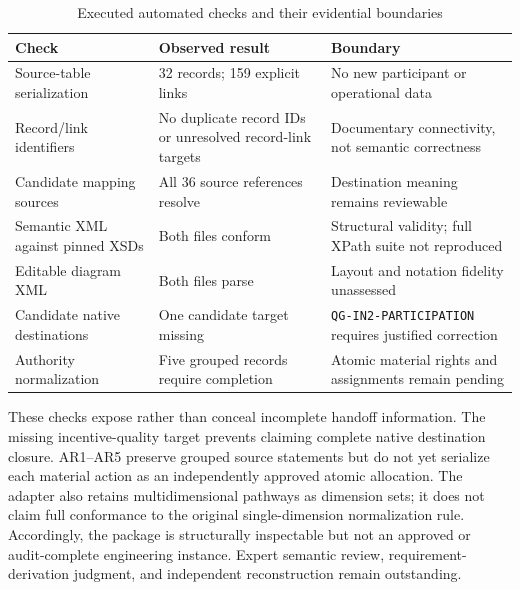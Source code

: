 \documentclass[referee,sn-basic]{sn-jnl}
\begin{document}
\begin{table}[t]
\caption{Executed automated checks and their evidential boundaries}
\label{tab:automated-replication}
\centering\footnotesize
\begin{tabularx}{\linewidth}{@{}p{.30\linewidth}p{.20\linewidth}X@{}}
\toprule
Check & Observed result & Boundary \\
\midrule
Source-table serialization & 32 records; 159 explicit links & No new participant or operational data \\
Record/link identifiers & No duplicate record IDs or unresolved record-link targets & Documentary connectivity, not semantic correctness \\
Candidate mapping sources & All 36 source references resolve & Destination meaning remains reviewable \\
Semantic XML against pinned XSDs & Both files conform & Structural validity; full XPath suite not reproduced \\
Editable diagram XML & Both files parse & Layout and notation fidelity unassessed \\
Candidate native destinations & One candidate target missing & \texttt{QG-IN2-PARTICIPATION} requires justified correction \\
Authority normalization & Five grouped records require completion & Atomic material rights and assignments remain pending \\
\bottomrule
\end{tabularx}
\end{table}

These checks expose rather than conceal incomplete handoff information. The
missing incentive-quality target prevents claiming complete native destination
closure. AR1--AR5 preserve grouped source statements but do not yet serialize
each material action as an independently approved atomic allocation. The adapter
also retains multidimensional pathways as dimension sets; it does not claim
full conformance to the original single-dimension normalization rule. Accordingly,
the package is structurally inspectable but not an approved or audit-complete
engineering instance. Expert semantic review, requirement-derivation judgment,
and independent reconstruction remain outstanding.
\end{document}
